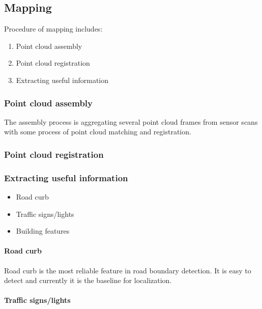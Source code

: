 \documentclass[conference]{IEEEtran}
\providecommand{\tightlist}{%
  \setlength{\itemsep}{0pt}\setlength{\parskip}{0pt}}
\let\oldparagraph\paragraph
\renewcommand{\paragraph}[1]{\oldparagraph{#1}\mbox{}}
\begin{document}
\subsection{Mapping}\label{mapping}

Procedure of mapping includes:

\begin{enumerate}
\def\labelenumi{\arabic{enumi}.}
\tightlist
\item
  Point cloud assembly
\item
  Point cloud registration
\item
  Extracting useful information
\end{enumerate}

\subsubsection{Point cloud assembly}\label{point-cloud-assembly}

The assembly process is aggregating several point cloud frames from
sensor scans with some process of point cloud matching and registration.

\subsubsection{Point cloud registration}\label{point-cloud-registration}

\subsubsection{Extracting useful
information}\label{extracting-useful-information}

\begin{itemize}
\tightlist
\item
  Road curb
\item
  Traffic signs/lights
\item
  Building features
\end{itemize}

\paragraph{Road curb}\label{road-curb}
Road curb is the most reliable feature in road boundary detection. It is
easy to detect and currently it is the baseline for localization.

\paragraph{Traffic signs/lights}\label{traffic-signslights}
\end{document}
